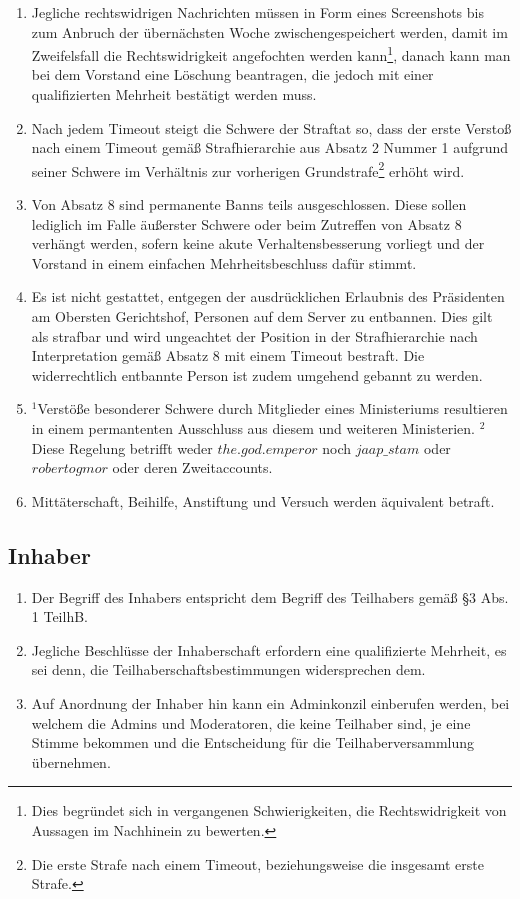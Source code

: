 \documentclass{article}
\begin{document}
\begin{enumerate}[(1)]
	\item Jegliche rechtswidrigen Nachrichten müssen in Form eines Screenshots bis zum Anbruch der übernächsten Woche zwischengespeichert werden, damit im Zweifelsfall die Rechtswidrigkeit angefochten werden kann\footnote{Dies begründet sich in vergangenen Schwierigkeiten, die Rechtswidrigkeit von Aussagen im Nachhinein zu bewerten.}, danach kann man bei dem Vorstand eine Löschung beantragen, die jedoch mit einer qualifizierten Mehrheit bestätigt werden muss.
	\item Nach jedem Timeout steigt die Schwere der Straftat so, dass der erste Verstoß nach einem Timeout gemäß Strafhierarchie aus Absatz 2 Nummer 1  aufgrund seiner Schwere im Verhältnis zur vorherigen Grundstrafe\footnote{Die erste Strafe nach einem Timeout, beziehungsweise die insgesamt erste Strafe.} erhöht wird.
	\item Von Absatz 8 sind permanente Banns teils ausgeschlossen. Diese sollen lediglich im Falle äußerster Schwere oder beim Zutreffen von Absatz 8 verhängt werden, sofern keine akute Verhaltensbesserung vorliegt und der Vorstand in einem einfachen Mehrheitsbeschluss dafür stimmt.
	\item Es ist nicht gestattet, entgegen der ausdrücklichen Erlaubnis des Präsidenten am Obersten Gerichtshof, Personen auf dem Server zu entbannen. Dies gilt als strafbar und wird ungeachtet der Position in der Strafhierarchie nach Interpretation gemäß Absatz 8 mit einem Timeout bestraft. Die widerrechtlich entbannte Person ist zudem umgehend gebannt zu werden.
	\item $^{1}$Verstöße besonderer Schwere durch Mitglieder eines Ministeriums resultieren in einem permantenten Ausschluss aus diesem und weiteren Ministerien. $^{2}$Diese Regelung betrifft weder $the.god.emperor$ noch $jaap\_stam$ oder $robertogmor$ oder deren Zweitaccounts.
	\item Mittäterschaft, Beihilfe, Anstiftung und Versuch werden äquivalent betraft.
\end{enumerate}

\subsection{Inhaber}
\begin{enumerate}[(1)]
	\item Der Begriff des Inhabers entspricht dem Begriff des Teilhabers gemäß §3 Abs. 1 TeilhB.
	\item Jegliche Beschlüsse der Inhaberschaft erfordern eine qualifizierte Mehrheit, es sei denn, die Teilhaberschaftsbestimmungen widersprechen dem.
	\item Auf Anordnung der Inhaber hin kann ein Adminkonzil einberufen werden, bei welchem die Admins und Moderatoren, die keine Teilhaber sind, je eine Stimme bekommen und die Entscheidung für die Teilhaberversammlung übernehmen.
\end{enumerate}
\end{document}
